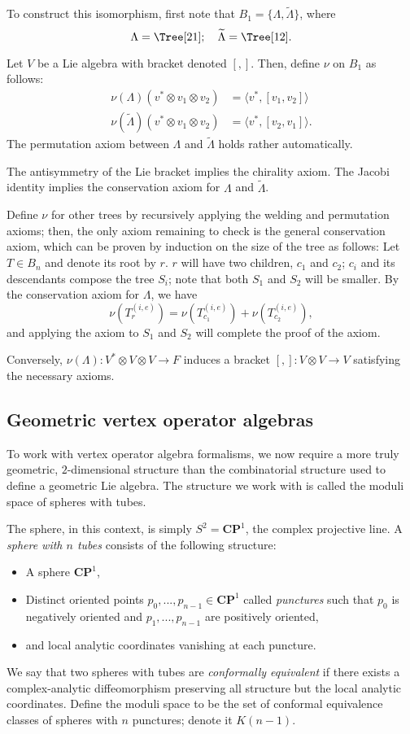 \documentclass{article}
\newcommand{\CP}{\mathbold{CP}}
\begin{document}
To construct this isomorphism, first note that $B_1=\{\Lambda,\widetilde{\Lambda}\}$, where
\[\Lambda=\Tree[ 2 1 ]; \quad \widetilde{\Lambda}=\Tree[ 1 2 ]. \]

Let $V$ be a Lie algebra with bracket denoted $[,]$.  Then, define $\nu$ on $B_1$ as follows:
\begin{align}
  \nu(\Lambda)(v^* \otimes v_1 \otimes v_2)&=\langle v^*,[v_1,v_2] \rangle\\
  \nu(\widetilde{\Lambda})(v^* \otimes v_1 \otimes v_2)&=\langle v^*,[v_2,v_1] \rangle.
\end{align}
The permutation axiom between $\Lambda$ and $\widetilde{\Lambda}$ holds rather automatically.

The antisymmetry of the Lie bracket implies the chirality axiom.  The Jacobi identity implies the conservation axiom for $\Lambda$ and $\widetilde{\Lambda}$.

Define $\nu$ for other trees by recursively applying the welding and permutation axioms; then, the only axiom remaining to check is the general conservation axiom, which can be proven by induction on the size of the tree as follows: Let $T \in B_n$ and denote its root by $r$.  $r$ will have two children, $c_1$ and $c_2$; $c_i$ and its descendants compose the tree $S_i$; note that both $S_1$ and $S_2$ will be smaller.  By the conservation axiom for $\Lambda$, we have
\[\nu(T^{(i,e)}_r)=\nu(T^{(i,e)}_{c_1})+\nu(T^{(i,e)}_{c_2}), \]
and applying the axiom to $S_1$ and $S_2$ will complete the proof of the axiom.

Conversely, $\nu(\Lambda):V^* \otimes V \otimes V \rightarrow F$ induces a bracket $[,]: V \otimes V \rightarrow V$ satisfying the necessary axioms.
\subsection{Geometric vertex operator algebras}
\label{sec:geomvoa}
To work with vertex operator algebra formalisms, we now require a more truly geometric, $2$-dimensional structure than the combinatorial structure used to define a geometric Lie algebra.  The structure we work with is called the moduli space of spheres with tubes.

The sphere, in this context, is simply $S^2=\CP^1$, the complex projective line.  A \textit{sphere with $n$ tubes} consists of the following structure:
\begin{itemize}
\item A sphere $\CP^1$,
\item Distinct oriented points $p_0,...,p_{n-1} \in \CP^1$ called \textit{punctures} such that $p_0$ is negatively oriented and $p_1,...,p_{n-1}$ are positively oriented,
\item and local analytic coordinates vanishing at each puncture.
\end{itemize}
We say that two spheres with tubes are \textit{conformally equivalent} if there exists a complex-analytic diffeomorphism preserving all structure but the local analytic coordinates.  Define the moduli space to be the set of conformal equivalence classes of spheres with $n$ punctures; denote it $K(n-1)$.
\end{document}
